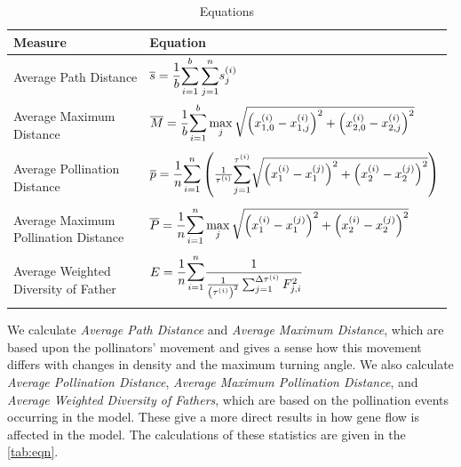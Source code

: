 \begin{table}[h]
  \centering
\setlength{\extrarowheight}{15pt}
\begin{tabular}{|l|l|}
  \hline
  Measure & Equation \\ \hline   \hline
  Average Path Distance & $\bar{s} = \dfrac{1}{b} \nsum\limits_{i=1}^b\,
    \nsum\limits_{j=1}^n s^{\left(i\right)}_j$ \\ \hline
  \multirow{2}{*}{\parbox{0.2\textwidth}{Average Maximum \\ Distance}} &
    $\bar{M} = \dfrac{1}{b} \nnsum_{i=1}^b \max\limits_j
        \sqrt{\left(x^{\left(i\right)}_{1,0} - x^{\left(i\right)}_{1,j}\right)^2
          + \left(x^{\left(i\right)}_{2,0} - x^{\left(i\right)}_{2,j}\right)^2}$
    \\ & \\ \hline
  \multirow{2}{*}{\parbox{0.2\textwidth}{Average Pollination \\ Distance}} &
    $\bar{p} = \dfrac{1}{n} \nnsum_{i=1}^{n}
        \left(\frac{1}{\tau^{\left(i\right)}} \nsum_{j=1}^{\tau^{\left(i\right)}}
            \sqrt{\left(x^{\left(i\right)}_1 - x^{\left(j\right)}_1\right)^2
            + \left(x^{\left(i\right)}_2 - x^{\left(j\right)}_2\right)^2}
        \right)$ \\ & \\ \hline
  \multirow{2}{*}{\parbox{0.2\textwidth}{Average Maximum \\
      Pollination Distance}} &
    $\bar{P} = \dfrac{1}{n} \nnsum_{i=1}^{n} \max\limits_j
      \sqrt{\left(x^{\left(i\right)}_1 - x^{\left(j\right)}_1\right)^2
        + \left(x^{\left(i\right)}_2 - x^{\left(j\right)}_2\right)^2}$ \\ & \\ \hline
  \multirow{2}{*}{\parbox{0.2\textwidth}{Average Weighted \\ Diversity of
      Father}} &
    $E = \dfrac{1}{n} \nnsum_{i=1}^n
      \dfrac{1}{\frac{1}{\left(\tau^{\left(i\right)}\right)^2}
      \sum_{j=1}^{\Delta\tau^{\left(i\right)}} F^2_{j,i}}$ \\ & \\ \hline
\end{tabular}
\caption{Equations}
\label{tab:eqn}
\end{table}

We calculate \emph{Average Path Distance} and \emph{Average Maximum Distance},
which are based upon the pollinators' movement and gives a sense how this
movement differs with changes in density and the maximum turning angle.  We also
calculate \emph{Average Pollination Distance}, \emph{Average Maximum Pollination
Distance}, and \emph{Average Weighted Diversity of Fathers}, which are based on
the pollination events occurring in the model.  These give a more direct results
in how gene flow is affected in the model.  The calculations of these statistics
are given in the \autoref{tab:eqn}.

